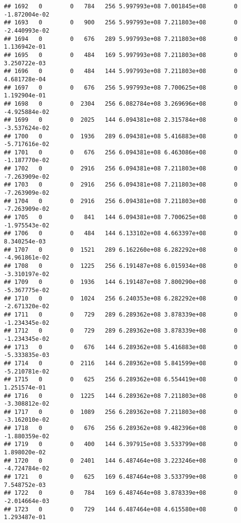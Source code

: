 \documentclass[
]{article}
\begin{document}
\begin{enumerate}
\begin{verbatim}
## 1692   0        0   784   256 5.997993e+08 7.001845e+08        0 -1.872004e-02
## 1693   0        0   900   256 5.997993e+08 7.211803e+08        0 -2.440993e-02
## 1694   0        0   676   289 5.997993e+08 7.211803e+08        0  1.136942e-01
## 1695   0        0   484   169 5.997993e+08 7.211803e+08        0  3.250722e-03
## 1696   0        0   484   144 5.997993e+08 7.211803e+08        0  4.681728e-04
## 1697   0        0   676   256 5.997993e+08 7.700625e+08        0  1.192904e-01
## 1698   0        0  2304   256 6.082784e+08 3.269696e+08        0 -4.925884e-02
## 1699   0        0  2025   144 6.094381e+08 2.315784e+08        0 -3.537624e-02
## 1700   0        0  1936   289 6.094381e+08 5.416883e+08        0 -5.717616e-02
## 1701   0        0   676   256 6.094381e+08 6.463086e+08        0 -1.187770e-02
## 1702   0        0  2916   256 6.094381e+08 7.211803e+08        0 -7.263909e-02
## 1703   0        0  2916   256 6.094381e+08 7.211803e+08        0 -7.263909e-02
## 1704   0        0  2916   256 6.094381e+08 7.211803e+08        0 -7.263909e-02
## 1705   0        0   841   144 6.094381e+08 7.700625e+08        0 -1.975543e-02
## 1706   0        0   484   144 6.133102e+08 4.663397e+08        0  8.340254e-03
## 1707   0        0  1521   289 6.162260e+08 6.282292e+08        0 -4.961861e-02
## 1708   0        0  1225   256 6.191487e+08 6.015934e+08        0 -3.310197e-02
## 1709   0        0  1936   144 6.191487e+08 7.800290e+08        0 -5.367775e-02
## 1710   0        0  1024   256 6.240353e+08 6.282292e+08        0 -2.671320e-02
## 1711   0        0   729   289 6.289362e+08 3.878339e+08        0 -1.234345e-02
## 1712   0        0   729   289 6.289362e+08 3.878339e+08        0 -1.234345e-02
## 1713   0        0   676   144 6.289362e+08 5.416883e+08        0 -5.333835e-03
## 1714   0        0  2116   144 6.289362e+08 5.841599e+08        0 -5.210781e-02
## 1715   0        0   625   256 6.289362e+08 6.554419e+08        0  1.251574e-01
## 1716   0        0  1225   144 6.289362e+08 7.211803e+08        0 -3.308812e-02
## 1717   0        0  1089   256 6.289362e+08 7.211803e+08        0 -3.162010e-02
## 1718   0        0   676   256 6.289362e+08 9.482396e+08        0 -1.880359e-02
## 1719   0        0   400   144 6.397915e+08 3.533799e+08        0  1.898020e-02
## 1720   0        0  2401   144 6.487464e+08 3.223246e+08        0 -4.724784e-02
## 1721   0        0   625   169 6.487464e+08 3.533799e+08        0  7.548752e-03
## 1722   0        0   784   169 6.487464e+08 3.878339e+08        0 -2.014664e-03
## 1723   0        0   729   144 6.487464e+08 4.615580e+08        0  1.293487e-01

\end{verbatim}
\end{enumerate}
\end{document}
